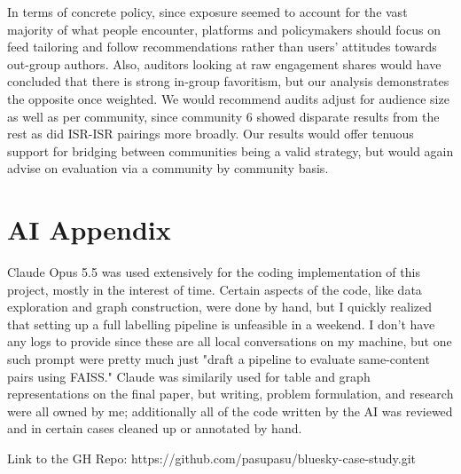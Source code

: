 \documentclass[11pt]{article}   %
\begin{document}
In terms of concrete policy, since exposure seemed to account for the vast majority of what people encounter, platforms and
policymakers should focus on feed tailoring and follow recommendations rather than users' attitudes towards out-group
authors. Also, auditors looking at raw engagement shares would have concluded that there is strong in-group favoritism,
but our analysis demonstrates the opposite once weighted. We would recommend audits adjust for audience size as well
as per community, since community 6 showed disparate results from the rest as did ISR-ISR pairings more broadly. Our results would offer tenuous support for bridging
between communities being a valid strategy, but would again advise on evaluation via a community by community basis.\bigskip

\section{AI Appendix}
Claude Opus 5.5 was used extensively for the coding implementation of this project, mostly in the interest of time. Certain aspects of the code,
like data exploration and graph construction, were done by hand, but I quickly realized that setting up a full labelling pipeline is unfeasible in a weekend.
I don't have any logs to provide since these are all local conversations on my machine, but one such prompt were pretty much just "draft a pipeline to evaluate same-content pairs using FAISS."
Claude was similarily used for table and graph representations on the final paper, but writing, problem formulation, and research were all owned by me; additionally 
all of the code written by the AI was reviewed and in certain cases cleaned up or annotated by hand. \bigskip

\noindent Link to the GH Repo: https://github.com/pasupasu/bluesky-case-study.git

\printbibliography 
\end{document}
